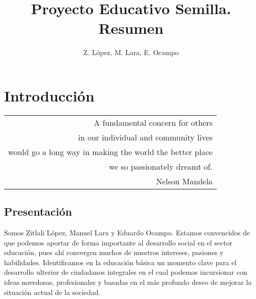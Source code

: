 \documentclass[10pt,letterpaper,oneside]{book}
\author{Z. López, M. Lara, E. Ocampo}
\title{Proyecto Educativo Semilla. Resumen}
\makeatletter
\newenvironment{myepigraph}
  {\par\hfill\itshape
   \begin{tabular}{@{}r@{\hspace{2em}}}} %
  {\end{tabular}\par\medskip}
\makeatother
\begin{document}
\maketitle
\tableofcontents

\chapter{Introducción}

\begin{myepigraph}A fundamental concern for others\\
in our individual and community lives\\
would go a long way in making the world the better place\\
we so passionately dreamt of.
\vspace{0.1cm}\\
Nelson Mandela
\end{myepigraph}

\section{Presentación}

Somos Zitlali López, Manuel Lara y Eduardo Ocampo. Estamos convencidos de que podemos aportar de forma importante al desarrollo social en el sector educación, pues ahí convergen muchos de nuestros intereses, pasiones y habilidades. Identificamos en la educación básica un momento clave para el desarrollo ulterior de ciudadanos integrales en el cual podemos incursionar con ideas novedosas, profesionales y basadas en el más profundo deseo de mejorar la situación actual de la sociedad.
\end{document}
